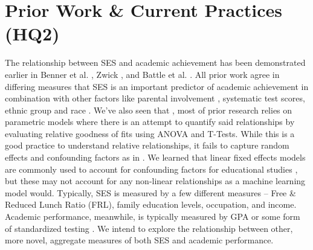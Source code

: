 \documentclass[sigconf,nonacm,11pt]{acmart}
\begin{document}
\section{Prior Work \& Current Practices (HQ2)}
The relationship between SES and academic achievement has been demonstrated earlier in Benner et al. \cite{parentalinvolvement}, Zwick \cite{collegescores}, and Battle et al. \cite{raceses}. All prior work agree in differing measures that SES is an important predictor of academic achievement in combination with other factors like parental involvement \cite{parentalinvolvement}, systematic test scores, ethnic group \cite{collegescores} and race \cite{raceses}. We've also seen that \cite{parentalinvolvement, collegescores, raceses, farooq}, most of prior research relies on parametric models where there is an attempt to quantify said relationships by evaluating relative goodness of fits using ANOVA and T-Tests. While this is a good practice to understand relative relationships, it fails to capture random effects and confounding factors as in \cite{collegescores, raceses}. We learned that linear fixed effects models are commonly used to account for confounding factors for educational studies \cite{jinnai, winters, harris}, but these may not account for any non-linear relationships as a machine learning model would. Typically, \cite{sirin} SES is measured by a few different measures -- Free \& Reduced Lunch Ratio (FRL), family education levels, occupation, and income.  Academic performance, meanwhile, is typically measured by GPA or some form of standardized testing \cite{sirin}.  We intend to explore the relationship between other, more novel, aggregate measures of both SES and academic performance.
\end{document}

